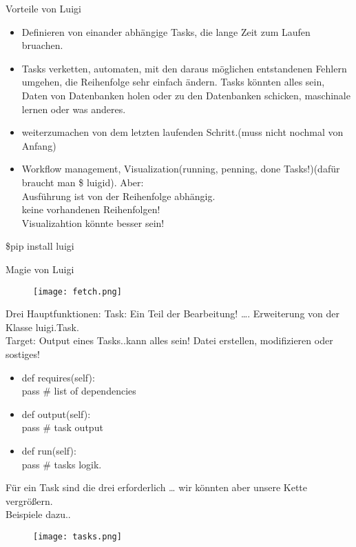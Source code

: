 \documentclass[t]{beamer}       %
\begin{document}
\begin{frame}{ Vorteile von Luigi}
\begin{itemize}
\item Definieren von einander abhängige Tasks, die lange Zeit zum Laufen bruachen.
\item Tasks verketten, automaten, mit den daraus möglichen entstandenen Fehlern umgehen, die Reihenfolge sehr einfach ändern. 
 Tasks könnten alles sein, Daten von Datenbanken holen oder zu den Datenbanken schicken, maschinale lernen oder was anderes.
\item weiterzumachen von dem letzten laufenden Schritt.(muss nicht nochmal von Anfang)\\
\item Workflow management, Visualization(running, penning, done Tasks!)(dafür braucht man \$ luigid).
Aber:\\
Ausführung ist von der Reihenfolge abhängig.\\
keine vorhandenen Reihenfolgen!\\
Visualizahtion könnte besser sein!\\

\end{itemize}
\begin{center}
\$pip install luigi
\end{center}
\end{frame}


\begin{frame}{Magie von Luigi}
\begin{figure}
\texttt{[image: fetch.png]}
\end{figure}

\end{frame}


\begin{frame}{ Drei Hauptfunktionen:}
Task: Ein Teil der Bearbeitung! …. Erweiterung von der Klasse luigi.Task.\\
Target: Output eines Tasks..kann alles sein! Datei erstellen, modifizieren oder sostiges!\\
\begin{itemize}
\item def requires(self):\\
pass \# list of dependencies
\item def output(self):\\
pass \# task output
\item def run(self):\\
pass \# tasks logik.
\end{itemize}

Für ein Task sind die drei erforderlich … wir könnten aber unsere Kette  vergrößern.\\
Beispiele dazu..
\end{frame}
\begin{frame}
\begin{figure}
\texttt{[image: tasks.png]}
\end{figure}
\end{frame}
\end{document}
